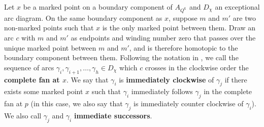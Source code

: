 \documentclass[12pt]{amsart}
\theoremstyle{plain}
\theoremstyle{definition}
\theoremstyle{remark}
\begin{document}
Let $x$ be a marked point {\color{black} on a boundary component of }$A_{Q^{\bm{\varepsilon}}}$ and $D_{\chi}$ an exceptional arc diagram. On the same boundary component as $x$, suppose $m$ and $m'$ are two non-marked points such that $x$ is the only marked point between them. Draw an arc $c$ with $m$ and $m'$ as endpoints and winding number zero that passes over the unique marked point between $m$ and $m'$, and is therefore  homotopic to the boundary component between them. Following the notation in \cite{baur2021geometric}, we call the sequence of arcs $\gamma_i, \gamma_{i+1}, \dots, \gamma_h \in D_{\chi}$ which $c$ crosses in the clockwise order the \textbf{complete fan at $x$}. We say that $\gamma_i$ is \textbf{immediately clockwise} of $\gamma_j$ if there exists some marked point $x$ such that $\gamma_i$ immediately follows $\gamma_j$ in the complete fan at $p$ (in this case, we also say that $\gamma_j$ is immediately counter clockwise of $\gamma_i$). We also call $\gamma_j$ and $\gamma_i$ \textbf{immediate successors}.
\end{document}
